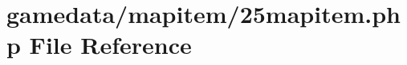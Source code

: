\hypertarget{25mapitem_8php}{\section{gamedata/mapitem/25mapitem.php File Reference}
\label{25mapitem_8php}
}

